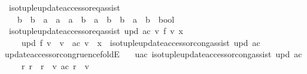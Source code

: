 \begin{isabellebody}
\isanewline
\ \ iso{\isacharunderscore}{\kern0pt}tuple{\isacharunderscore}{\kern0pt}update{\isacharunderscore}{\kern0pt}accessor{\isacharunderscore}{\kern0pt}eq{\isacharunderscore}{\kern0pt}assist\ {\isacharcolon}{\kern0pt}{\isacharcolon}{\kern0pt}\isanewline
\ \ \ \ {\isachardoublequoteopen}{\isacharparenleft}{\kern0pt}{\isacharparenleft}{\kern0pt}{\isacharprime}{\kern0pt}b\ {\isasymRightarrow}\ {\isacharprime}{\kern0pt}b{\isacharparenright}{\kern0pt}\ {\isasymRightarrow}\ {\isacharparenleft}{\kern0pt}{\isacharprime}{\kern0pt}a\ {\isasymRightarrow}\ {\isacharprime}{\kern0pt}a{\isacharparenright}{\kern0pt}{\isacharparenright}{\kern0pt}\ {\isasymRightarrow}\ {\isacharparenleft}{\kern0pt}{\isacharprime}{\kern0pt}a\ {\isasymRightarrow}\ {\isacharprime}{\kern0pt}b{\isacharparenright}{\kern0pt}\ {\isasymRightarrow}\ {\isacharprime}{\kern0pt}a\ {\isasymRightarrow}\ {\isacharparenleft}{\kern0pt}{\isacharprime}{\kern0pt}b\ {\isasymRightarrow}\ {\isacharprime}{\kern0pt}b{\isacharparenright}{\kern0pt}\ {\isasymRightarrow}\ {\isacharprime}{\kern0pt}a\ {\isasymRightarrow}\ {\isacharprime}{\kern0pt}b\ {\isasymRightarrow}\ bool{\isachardoublequoteclose}\ \isanewline
\ \ {\isachardoublequoteopen}iso{\isacharunderscore}{\kern0pt}tuple{\isacharunderscore}{\kern0pt}update{\isacharunderscore}{\kern0pt}accessor{\isacharunderscore}{\kern0pt}eq{\isacharunderscore}{\kern0pt}assist\ upd\ ac\ v\ f\ v{\isacharprime}{\kern0pt}\ x\ {\isasymlongleftrightarrow}\isanewline
\ \ \ \ \ upd\ f\ v\ {\isacharequal}{\kern0pt}\ v{\isacharprime}{\kern0pt}\ {\isasymand}\ ac\ v\ {\isacharequal}{\kern0pt}\ x\ {\isasymand}\ iso{\isacharunderscore}{\kern0pt}tuple{\isacharunderscore}{\kern0pt}update{\isacharunderscore}{\kern0pt}accessor{\isacharunderscore}{\kern0pt}cong{\isacharunderscore}{\kern0pt}assist\ upd\ ac{\isachardoublequoteclose}\isanewline
\isanewline
{}\isamarkupfalse%
\ update{\isacharunderscore}{\kern0pt}accessor{\isacharunderscore}{\kern0pt}congruence{\isacharunderscore}{\kern0pt}foldE{\isacharcolon}{\kern0pt}\isanewline
\ \ \ uac{\isacharcolon}{\kern0pt}\ {\isachardoublequoteopen}iso{\isacharunderscore}{\kern0pt}tuple{\isacharunderscore}{\kern0pt}update{\isacharunderscore}{\kern0pt}accessor{\isacharunderscore}{\kern0pt}cong{\isacharunderscore}{\kern0pt}assist\ upd\ ac{\isachardoublequoteclose}\isanewline
\ \ \ \ \ r{\isacharcolon}{\kern0pt}\ {\isachardoublequoteopen}r\ {\isacharequal}{\kern0pt}\ r{\isacharprime}{\kern0pt}{\isachardoublequoteclose}\ \ v{\isacharcolon}{\kern0pt}\ {\isachardoublequoteopen}ac\ r{\isacharprime}{\kern0pt}\ {\isacharequal}{\kern0pt}\ v{\isacharprime}{\kern0pt}{\isachardoublequoteclose}\isanewline

\end{isabellebody}
